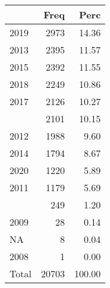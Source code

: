
\begin{tabular}[t]{lrr}
\toprule
  & Freq & Perc\\
\midrule
2019 & 2973 & 14.36\\
2013 & 2395 & 11.57\\
2015 & 2392 & 11.55\\
2018 & 2249 & 10.86\\
2017 & 2126 & 10.27\\
\addlinespace
2016 & 2101 & 10.15\\
2012 & 1988 & 9.60\\
2014 & 1794 & 8.67\\
2020 & 1220 & 5.89\\
2011 & 1179 & 5.69\\
\addlinespace
2010 & 249 & 1.20\\
2009 & 28 & 0.14\\
NA & 8 & 0.04\\
2008 & 1 & 0.00\\
Total & 20703 & 100.00\\
\bottomrule
\end{tabular}